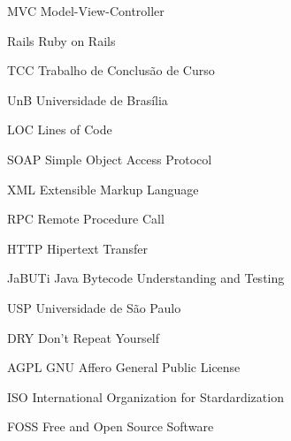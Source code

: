 \begin{siglas}
  
  \item[MVC] Model-View-Controller
  \item[Rails] Ruby on Rails
  \item[TCC] Trabalho de Conclusão de Curso
  \item[UnB] Universidade de Brasília
  \item[LOC] Lines of Code
  \item[SOAP] Simple Object Access Protocol
  \item[XML] Extensible Markup Language
  \item[RPC] Remote Procedure Call
  \item[HTTP] Hipertext Transfer
  \item[JaBUTi] Java Bytecode Understanding and Testing
  \item[USP] Universidade de São Paulo
  \item[DRY] Don't Repeat Yourself
  \item[AGPL] GNU Affero General Public License
  \item[ISO] International Organization for Stardardization
  \item[FOSS] Free and Open Source Software
  
\end{siglas}
